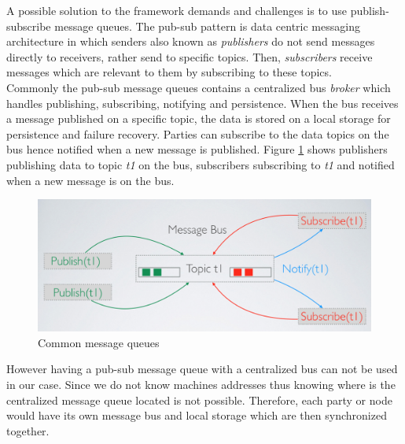  

\noindent A possible solution to the framework demands and challenges is to use publish-subscribe message queues. The pub-sub pattern is data centric messaging architecture in which senders also known as \textit{publishers} do not send messages directly to receivers, rather send to specific topics. Then, \textit{subscribers} receive messages which are relevant to them by subscribing to these topics. \\


\noindent Commonly the pub-sub message queues contains a centralized bus \textit{broker} which handles publishing, subscribing, notifying and persistence. 
When the bus receives a message published on a specific topic, the data is stored on a local storage for persistence and failure recovery. 
Parties can subscribe to the data topics on the  bus hence notified when a new message is published. Figure \ref{fig:message-queues} shows  publishers publishing data to topic \textit{t1} on the bus, subscribers subscribing to \textit{t1} and notified when a new message is on the bus.
	
\begin{figure}[H]
	\centering
	\includegraphics[scale=0.5]{images/message-queues.png}
	\caption{Common message queues}
	\label{fig:message-queues}
\end{figure}

\noindent However having a pub-sub message queue with a centralized bus can not be used in our case. Since we do not know machines addresses thus knowing where is the centralized message queue located is not possible. Therefore, each party or node would have its own message bus and local storage which are then synchronized together.

